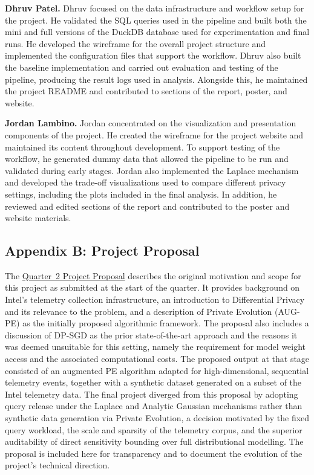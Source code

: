 \documentclass[12pt,letterpaper]{article}
\begin{document}
\textbf{Dhruv Patel.}
Dhruv focused on the data infrastructure and workflow setup for the project. He validated the SQL queries used in the pipeline and built both the mini and full versions of the DuckDB database used for experimentation and final runs. He developed the wireframe for the overall project structure and implemented the configuration files that support the workflow. Dhruv also built the baseline implementation and carried out evaluation and testing of the pipeline, producing the result logs used in analysis. Alongside this, he maintained the project README and contributed to sections of the report, poster, and website.

\textbf{Jordan Lambino.}
Jordan concentrated on the visualization and presentation components of the project. He created the wireframe for the project website and maintained its content throughout development. To support testing of the workflow, he generated dummy data that allowed the pipeline to be run and validated during early stages. Jordan also implemented the Laplace mechanism and developed the trade-off visualizations used to compare different privacy settings, including the plots included in the final analysis. In addition, he reviewed and edited sections of the report and contributed to the poster and website materials.

\newpage
\subsection{Appendix B: Project Proposal}

The \href{https://drive.google.com/file/d/1-uWLW_FLOvIJ-335J9SwYmFleC-lXZaR/view?usp=sharing}{Quarter~2 Project Proposal} describes the original motivation and scope for this project as submitted at the start of the quarter. It provides background on Intel's telemetry collection infrastructure, an introduction to Differential Privacy and its relevance to the problem, and a description of Private Evolution (AUG-PE) as the initially proposed algorithmic framework. The proposal also includes a discussion of DP-SGD as the prior state-of-the-art approach and the reasons it was deemed unsuitable for this setting, namely the requirement for model weight access and the associated computational costs. The proposed output at that stage consisted of an augmented PE algorithm adapted for high-dimensional, sequential telemetry events, together with a synthetic dataset generated on a subset of the Intel telemetry data. The final project diverged from this proposal by adopting query release under the Laplace and Analytic Gaussian mechanisms rather than synthetic data generation via Private Evolution, a decision motivated by the fixed query workload, the scale and sparsity of the telemetry corpus, and the superior auditability of direct sensitivity bounding over full distributional modelling. The proposal is included here for transparency and to document the evolution of the project's technical direction.
\end{document}
